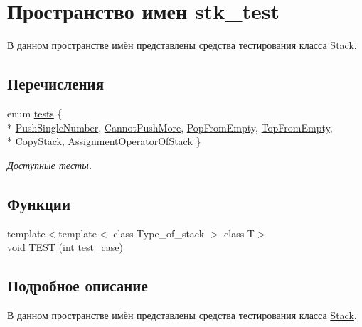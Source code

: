 \hypertarget{namespacestk__test}{}\section{Пространство имен stk\+\_\+test}
\label{namespacestk__test}


В данном пространстве имён представлены средства тестирования класса \hyperlink{class_stack}{Stack}.  


\subsection*{Перечисления}
\begin{DoxyCompactItemize}
\item 
enum \hyperlink{namespacestk__test_aee7ec7a767abf7b0b65ce9a2afb7de78}{tests} \{ \\*
\hyperlink{namespacestk__test_aee7ec7a767abf7b0b65ce9a2afb7de78a16992c4d9ecd605ea8503740aee9df96}{Push\+Single\+Number}, 
\hyperlink{namespacestk__test_aee7ec7a767abf7b0b65ce9a2afb7de78a6e2bd84a1d3046f2c01c930a1d52be64}{Cannot\+Push\+More}, 
\hyperlink{namespacestk__test_aee7ec7a767abf7b0b65ce9a2afb7de78ae9c603d2f7d582fd4fdd5db8140ceecf}{Pop\+From\+Empty}, 
\hyperlink{namespacestk__test_aee7ec7a767abf7b0b65ce9a2afb7de78acd574f7057fc049aa4da1da5f4b7fd3a}{Top\+From\+Empty}, 
\\*
\hyperlink{namespacestk__test_aee7ec7a767abf7b0b65ce9a2afb7de78aef89859ac32f020e99414e3d3e559713}{Copy\+Stack}, 
\hyperlink{namespacestk__test_aee7ec7a767abf7b0b65ce9a2afb7de78adc3b2cd62978794a43af9212cd2c6be7}{Assignment\+Operator\+Of\+Stack}
 \}
\begin{DoxyCompactList}\small\item\em Доступные тесты. \end{DoxyCompactList}\end{DoxyCompactItemize}
\subsection*{Функции}
\begin{DoxyCompactItemize}
\item 
{\footnotesize template$<$template$<$ class Type\+\_\+of\+\_\+stack $>$ class T$>$ }\\void \hyperlink{namespacestk__test_a6e5c68f4363af9e5204334b3c875d641}{T\+E\+S\+T} (int test\+\_\+case)
\end{DoxyCompactItemize}


\subsection{Подробное описание}
В данном пространстве имён представлены средства тестирования класса \hyperlink{class_stack}{Stack}. 

